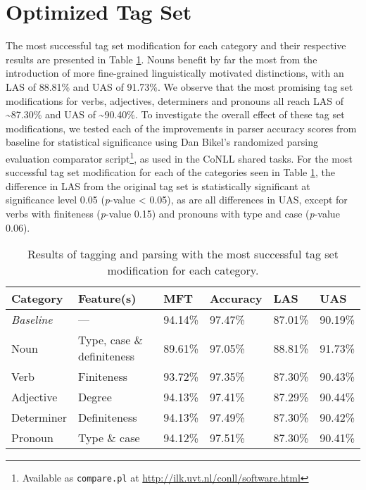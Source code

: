 \documentclass[a4paper,12pt,english]{book}
\begin{document}
\section{Optimized Tag Set} \label{sec:optimizedtagset} The most successful tag
set modification for each category and their respective results are presented
in Table \ref{respectiveresults}. Nouns benefit by far the most from the
introduction of more fine-grained linguistically motivated distinctions, with
an LAS of 88.81\% and UAS of 91.73\%. We observe that the most promising tag
set modifications for verbs, adjectives, determiners and pronouns all reach LAS
of \textasciitilde 87.30\% and UAS of \textasciitilde 90.40\%. To investigate
the overall effect of these tag set modifications, we tested each of the
improvements in parser accuracy scores from baseline for statistical
significance using Dan Bikel's randomized parsing evaluation comparator
script\footnote{Available as \texttt{compare.pl} at
    \url{http://ilk.uvt.nl/conll/software.html}}, as used in the CoNLL shared
tasks. For the most successful tag set modification for each of the categories
seen in Table \ref{respectiveresults}, the difference in LAS from the original
tag set is statistically significant at significance level 0.05 (\emph{p}-value
< 0.05), as are all differences in UAS, except for verbs with finiteness
(\emph{p}-value 0.15) and pronouns with type and case (\emph{p}-value 0.06).

\begin{table}
    \centering
    \smaller[0.5]
    \begin{tabular}{@{}llllll@{}}
        \toprule
        \textbf{Category} & \textbf{Feature(s)} & \textbf{MFT} &
        \textbf{Accuracy} & \textbf{LAS} & \textbf{UAS} \\
        \midrule
        \emph{Baseline} & --- & 94.14\% & 97.47\% & 87.01\% & 90.19\% \\
        Noun & Type, case \& definiteness & 89.61\% & 97.05\% & 88.81\% &
        91.73\% \\
        Verb & Finiteness & 93.72\% & 97.35\% & 87.30\% & 90.43\% \\
        Adjective & Degree & 94.13\% & 97.41\% & 87.29\% & 90.44\% \\
        Determiner & Definiteness & 94.13\% & 97.49\% & 87.30\% & 90.42\% \\
        Pronoun & Type \& case & 94.12\% & 97.51\% & 87.30\% & 90.41\% \\
        \bottomrule
    \end{tabular}
    \caption{Results of tagging and parsing with the most successful tag set
        modification for each category.}
    \label{respectiveresults}
\end{table}
\end{document}
